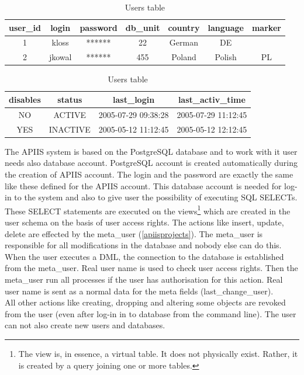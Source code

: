\begin{table}[h]
\begin{center}\begin{tabular}{|c|c|c|c|c|c|c|}
\hline 
user\_id&login&password&db\_unit&country&language&marker\tabularnewline
\hline
\hline
1&kloss&******&22&German&DE\tabularnewline
\hline 
2&jkowal&******&455&Poland&Polish&PL\tabularnewline
\hline 
\end{tabular}\end{center}

\begin{center}\begin{tabular}{|c|c|c|c|}
\hline 
disables&status&last\_login&last\_activ\_time\tabularnewline
\hline
\hline
NO&ACTIVE&2005-07-29 09:38:28&2005-07-29 11:12:45\tabularnewline
\hline 
YES&INACTIVE&2005-05-12 11:12:45&2005-05-12 12:12:45\tabularnewline
\hline 
\end{tabular}\end{center}
\caption{Users table} \label{usertable}
\end{table}

The APIIS system is based on the PostgreSQL database and to work with it user needs also database account. PostgreSQL account is created automatically during the creation of APIIS account. The login and the password are exactly the same like these defined for the APIIS account.
This database account is needed for log-in to the system and also to give user the possibility of executing SQL SELECTs. These SELECT statements are executed on the views\footnote{The view is, in essence, a virtual table. It does not physically exist. Rather, it is created by a query joining one or more tables.} which are created in the user schema on the basis of user access rights.
The actions like insert, update, delete are effected by the meta\_user (\ref{apiisprojects}). The meta\_user is responsible for all modifications in the database and nobody else can do this. When the user executes a DML, the connection to the database is established from the meta\_user. Real user name is used to check user access rights. Then the meta\_user run all processes if the user has authorisation for this action. Real user name is sent as a normal data for the meta fields (last\_change\_user).\\
All other actions like creating, dropping and altering some objects are revoked from the user (even after log-in in to database from the command line). The user can not also create new users and databases.

